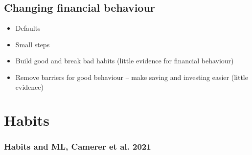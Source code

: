 \documentclass[a4paper, 11pt]{report}
\begin{document}
					\chapter{Changing financial behaviour}

\begin{itemize}
	\item Defaults \citep{thaler2004save,madrian2001power}
	\item Small steps \citep{hershfield2019temporal}
	\item Build good and break bad habits (little evidence for financial behaviour)
	\item Remove barriers for good behaviour -- make saving and investing easier (little evidence)
\end{itemize}








							\part{Habits}

\section{Habits and ML, Camerer et al. 2021}
\end{document}
